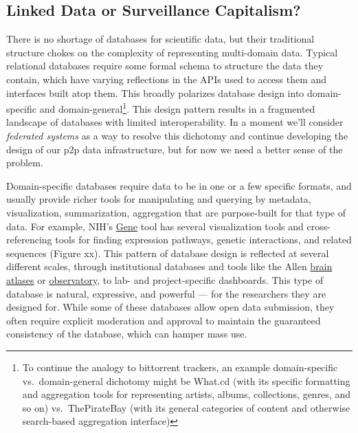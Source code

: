 \documentclass[notoc]{tufte-book}
\begin{document}
\subsection{Linked Data or Surveillance
Capitalism?}



 There is no shortage of databases for scientific data, but
their traditional structure chokes on the complexity of representing
multi-domain data. Typical relational databases require some formal
schema to structure the data they contain, which have varying
reflections in the APIs used to access them and interfaces built atop
them. This broadly polarizes database design into domain-specific and
domain-general\footnote{To continue the analogy to bittorrent trackers,
  an example domain-specific vs.~domain-general dichotomy might be
  What.cd (with its specific formatting and aggregation tools for
  representing artists, albums, collections, genres, and so on)
  vs.~ThePirateBay (with its general categories of content and otherwise
  search-based aggregation interface)}. This design pattern results in a
fragmented landscape of databases with limited interoperability. In a
moment we'll consider \emph{federated systems} as a way to resolve this
dichotomy and continue developing the design of our p2p data
infrastructure, but for now we need a better sense of the problem.

Domain-specific databases require data to be in one or a few specific
formats, and usually provide richer tools for manipulating and querying
by metadata, visualization, summarization, aggregation that are
purpose-built for that type of data. For example, NIH's
\href{https://www.ncbi.nlm.nih.gov/gene/12550}{Gene} tool has several
visualization tools and cross-referencing tools for finding expression
pathways, genetic interactions, and related sequences (Figure xx). This
pattern of database design is reflected at several different scales,
through institutional databases and tools like the Allen
\href{https://connectivity.brain-map.org/}{brain atlases} or
\href{http://observatory.brain-map.org/visualcoding/}{observatory}, to
lab- and project-specific dashboards. This type of database is natural,
expressive, and powerful --- for the researchers they are designed for.
While some of these databases allow open data submission, they often
require explicit moderation and approval to maintain the guaranteed
consistency of the database, which can hamper mass use.
\end{document}
